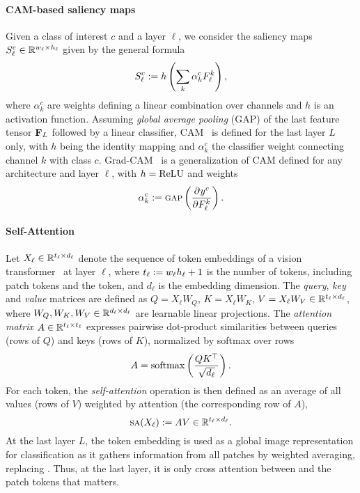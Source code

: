 \paragraph{CAM-based saliency maps}

Given a class of interest $c$ and a layer $\ell$, we consider the saliency maps $S^c_\ell \in \mathbb{R}^{w_\ell \times h_\ell}$ given by the general formula
\begin{equation}
	S^c_\ell \mathrel{:=} h \left( \sum_k \alpha^c_k F^k_\ell \right),
\label{eq:sal}
\end{equation}
where $\alpha^c_k$ are weights defining a linear combination over channels and $h$ is an activation function. Assuming \emph{global average pooling} (GAP) of the last feature tensor $\mathbf{F}_L$ followed by a linear classifier, CAM~\citep{zhou2016learning} is defined for the last layer $L$ only, with $h$ being the identity mapping and $\alpha^c_k$ the classifier weight connecting channel $k$ with class $c$. Grad-CAM~\citep{DBLP:journals/corr/SelvarajuDVCPB16} is a generalization of CAM defined for any architecture and layer $\ell$, with $h = {\operatorname{ReLU}}$ and weights
\begin{equation}
	\alpha^c_k \mathrel{:=} {\textsc{gap}} \left( \frac{\partial^{}{y^c}}{\partial{{F^k_\ell}^{}}} \right).
\label{eq:gcam}
\end{equation}


\paragraph{Self-Attention}

Let $X_\ell \in \mathbb{R}^{t_\ell \times d_\ell}$ denote the sequence of token embeddings of a vision transformer~\cite{dosovitskiy2020image} at layer $\ell$, where $t_\ell \mathrel{:=} w_\ell h_\ell + 1$ is the number of tokens, including patch tokens and the \cls token, and $d_\ell$ is the embedding dimension. The \emph{query}, \emph{key} and \emph{value} matrices are defined as $Q = X_\ell W_Q$, $K = X_\ell W_K$, $V = X_\ell W_V \in \mathbb{R}^{t_\ell \times d_\ell}$, where $W_Q, W_K, W_V \in \mathbb{R}^{d_\ell \times d_\ell}$ are learnable linear projections. The \emph{attention matrix} $A \in \mathbb{R}^{t_\ell \times t_\ell}$ expresses pairwise dot-product similarities between queries (rows of $Q$) and keys (rows of $K$), normalized by softmax over rows
\begin{equation}
	A = \operatorname{softmax} \left( \frac{Q K^\top}{\sqrt{d_\ell}} \right).
\label{eq:attention}
\end{equation}
For each token, the \emph{self-attention} operation is then defined as an average of all values (rows of $V$) weighted by attention (the corresponding  row of $A$),
\begin{equation}
	{\textsc{sa}}(X_\ell) \mathrel{:=} A V \in \mathbb{R}^{t_\ell \times d_\ell}.
\label{eq:SA}
\end{equation}
At the last layer $L$, the \cls token embedding is used as a global image representation for classification as it gathers information from all patches by weighted averaging, replacing \gap. Thus, at the last layer, it is only cross attention between \cls and the patch tokens that matters.



